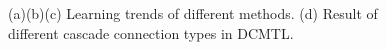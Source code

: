 \begin{figure}[h]
	\centering
	\caption{(a)(b)(c) Learning trends of different methods.
			(d) Result of different cascade connection types in DCMTL.}
	\label{fig:learning_curve}
	\vspace{-10pt}
\end{figure}

